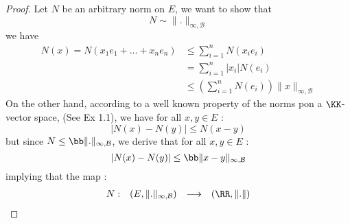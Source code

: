 \begin{proof}
Let $N$ be an arbitrary norm on $E$, we want to show that 
\[
N \sim \| . \| _{\infty ,\mathcal{B} }
\]
we have 
\begin{align*}
	N \left( x \right) = N \left( x_1 e_1 + \hdots + x_{n} e_{n} \right)  
			   & \leq 
			   \sum_{i=1}^{n} 
			   N \left( x_{i} e_{i} \right)  \\
			   &= \sum_{i=1}^{n}  \left| x_{i} \right|
			   N \left( e_{i} \right) 
			   \\
			   & \leq 
			   \left( 
				   \sum_{i=1}^{n} 
				   N \left( e_{i} \right)
			   \right)  \| x \| _{\infty , \mathcal{B} }
\end{align*}                                                    
On the other hand, according to a well known property of the norms
pon a $\KK$-vector space, (See Ex 1.1), 
we have for all $x,y \in E$  :
\[
\left| 
N(x) - N(y) 
\right|
\leq 
N (x-y) 
\]
but since $N \leq \bb  \| . \|_{\infty , \mathcal{B} } $,
we derive that for all $x,y \in E$  : 
\[
\left| N(x) - N(y)  \right| \leq 
\bb  \| x-y \| _{\infty , \mathcal{B} }
\]
implying  that the map :
\[
\begin{array}{cccc}
      N  : &  \left( E, \| . \| _{\infty ,\mathcal{B} } \right)  & \longrightarrow & 
      \left( \RR , \| . \|  \right)\\


\end{array}\]
\end{proof}
